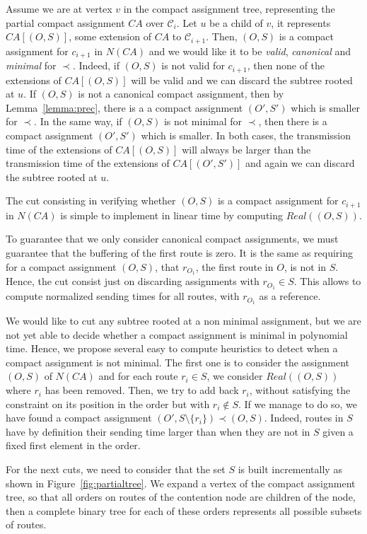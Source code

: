 Assume we are at vertex $v$ in the compact assignment tree, representing the partial compact assignment $CA$
over $\mathcal{C}_i$. Let $u$ be a child of $v$, it represents $CA[(O,S)]$, some extension of $CA$ to $\mathcal{C}_{i+1}$. Then, $(O,S)$ is a compact assignment for $c_{i+1}$ in $N(CA)$ and we would like it to be \emph{valid}, \emph{canonical} and \emph{minimal} for $\prec$. Indeed, if $(O,S)$ is not valid for $c_{i+1}$, then none of the extensions of $CA[(O,S)]$ will be valid and we can discard the subtree rooted at $u$.
If $(O,S)$ is not a canonical compact assignment, then by Lemma~\ref{lemma:prec}, there is a a compact assignment $(O',S')$ which is smaller for $\prec$. In the same way, if $(O,S)$ is not minimal for $\prec$, then there is a compact assignment $(O',S')$ which is smaller. In both cases, the transmission time of the extensions of $CA[(O,S)]$ will always be larger than the transmission time of the extensions of $CA[(O',S')]$ and again we can discard the subtree rooted at $u$.


The cut consisting in verifying whether $(O,S)$ is a compact assignment for $c_{i+1}$ in $N(CA)$ is simple to
implement in linear time by computing $Real((O,S))$. 

To guarantee that we only consider canonical compact assignments, we must guarantee that the 
buffering of the first route is zero. It is the same as requiring for a compact assignment $(O,S)$, that $r_{O_1}$, the first route in $O$, is not in $S$. Hence, the cut consist just on discarding assignments with $r_{O_1} \in S$.
This allows to compute normalized sending times for all routes, with $r_{O_1}$ as a reference.

We would like to cut any subtree rooted at a non minimal assignment, but we are not yet able to decide whether a compact assignment is minimal in polynomial time. Hence, we propose several easy to compute heuristics to detect when a compact assignment is not minimal. 
The first one is to consider the assignment $(O,S)$ of $N(CA)$ and for each route
$r_i \in S$, we consider $Real((O,S))$ where $r_i$ has been removed. Then, we try to add back $r_i$, without 
satisfying the constraint on its position in the order but with $r_i \notin S$. If we manage to do so, we have found 
a compact assignment $(O',S\setminus \{r_i\}) \prec (O,S)$. Indeed, routes in $S$ have by definition their sending time
larger than when they are not in $S$ given a fixed first element in the order.

For the next cuts, we need to consider that the set $S$ is built incrementally as shown in 
Figure~\ref{fig:partialtree}. We expand a vertex of the compact assignment tree, so that all orders on routes of the contention node are children of the node, then a complete binary tree for each of these orders represents all possible subsets of routes.


